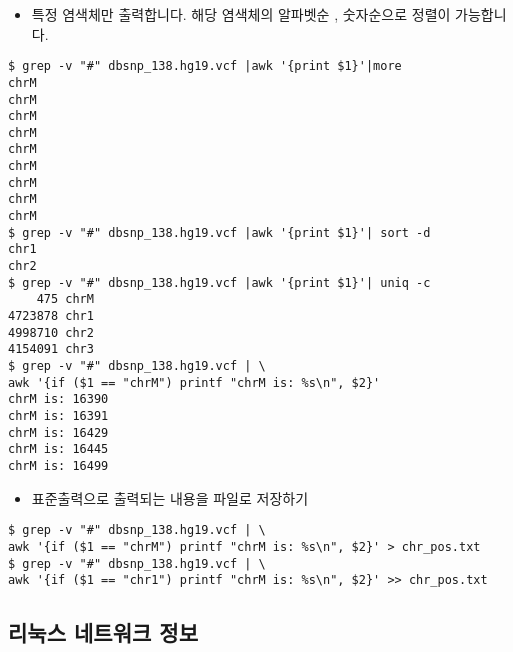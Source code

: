 \documentclass{article}
\begin{document}
\begin{itemize}
\item
  \begin{itemize}
  특정 염색체만 출력합니다. 해당 염색체의 알파벳순 , 숫자순으로 정렬이 가능합니다. 
  \end{itemize}
\end{itemize}
\begin{lstlisting}[frame=single,style=Bash,xleftmargin=1.4cm,xrightmargin=1.4cm]
$ grep -v "#" dbsnp_138.hg19.vcf |awk '{print $1}'|more
chrM
chrM
chrM
chrM
chrM
chrM
chrM
chrM
chrM
$ grep -v "#" dbsnp_138.hg19.vcf |awk '{print $1}'| sort -d
chr1
chr2
$ grep -v "#" dbsnp_138.hg19.vcf |awk '{print $1}'| uniq -c
    475 chrM
4723878 chr1
4998710 chr2
4154091 chr3
$ grep -v "#" dbsnp_138.hg19.vcf | \
awk '{if ($1 == "chrM") printf "chrM is: %s\n", $2}'
chrM is: 16390
chrM is: 16391
chrM is: 16429
chrM is: 16445
chrM is: 16499
\end{lstlisting}

\begin{itemize}
\item
  \begin{itemize}
  표준출력으로 출력되는 내용을 파일로 저장하기  
  \end{itemize}
\end{itemize}
\begin{lstlisting}[frame=single,style=Bash,xleftmargin=1.4cm,xrightmargin=1.4cm]
$ grep -v "#" dbsnp_138.hg19.vcf | \
awk '{if ($1 == "chrM") printf "chrM is: %s\n", $2}' > chr_pos.txt
$ grep -v "#" dbsnp_138.hg19.vcf | \
awk '{if ($1 == "chr1") printf "chrM is: %s\n", $2}' >> chr_pos.txt
\end{lstlisting}

\subsection{리눅스 네트워크 정보}\label{sec:cr}
\end{document}
